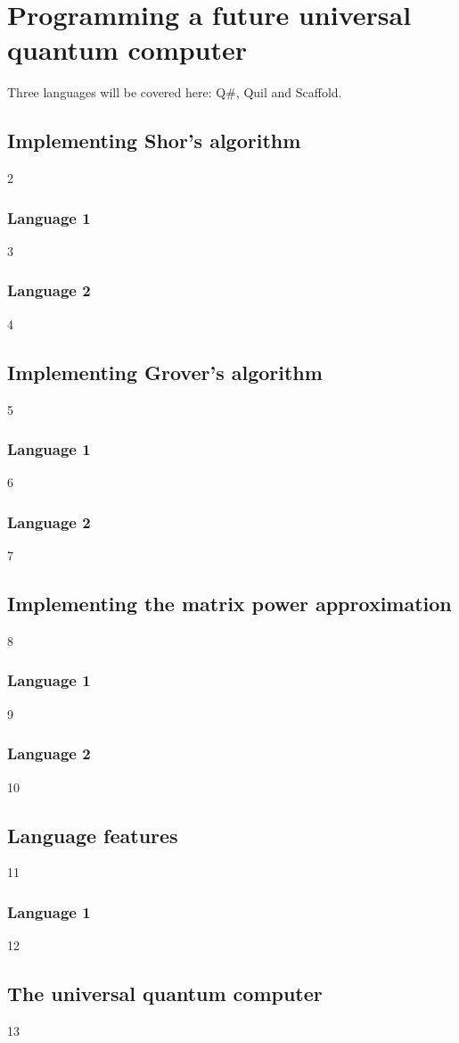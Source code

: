 \section{Programming a future universal quantum computer}\label{Programmingquantumcomputer}
Three languages will be covered here: Q\#, Quil and Scaffold.
\subsection{Implementing Shor's algorithm}
2
\subsubsection{Language 1}
3
\subsubsection{Language 2}
4
\subsection{Implementing Grover's algorithm}
5
\subsubsection{Language 1}
6
\subsubsection{Language 2}
7
\subsection{Implementing the matrix power approximation}
8
\subsubsection{Language 1}
9
\subsubsection{Language 2}
10
\subsection{Language features}
11
\subsubsection{Language 1}
12
\subsection{The universal quantum computer}
13

